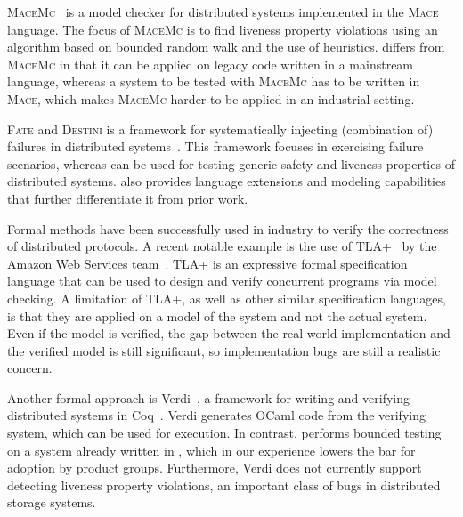 \textsc{MaceMc}~\cite{killian2007life} is a model checker for distributed systems implemented in the \textsc{Mace} language. The focus of \textsc{MaceMc} is to find liveness property violations using an algorithm based on bounded random walk and the use of heuristics. \psharp differs from \textsc{MaceMc} in that it can be applied on legacy code written in a mainstream language, whereas a system to be tested with \textsc{MaceMc} has to be written in \textsc{Mace}, which makes \textsc{MaceMc} harder to be applied in an industrial setting.

\textsc{Fate} and \textsc{Destini} is a framework for systematically injecting (combination of) failures in distributed systems~\cite{gunawi2011fate}. This framework focuses in exercising failure scenarios, whereas \psharp can be used for testing generic safety and liveness properties of distributed systems. \psharp also provides language extensions and modeling capabilities that further differentiate it from prior work.

Formal methods have been successfully used in industry to verify the correctness of distributed protocols. A recent notable example is the use of TLA+~\cite{lamport1994temporal} by the Amazon Web Services team~\cite{newcombe2015aws}. TLA+ is an expressive formal specification language that can be used to design and verify concurrent programs via model checking. A limitation of TLA+, as well as other similar specification languages, is that they are applied on a model of the system and not the actual system. Even if the model is verified, the gap between the real-world implementation and the verified model is still significant, so implementation bugs are still a realistic concern.

Another formal approach is Verdi~\cite{wilcox2015verdi}, a framework for writing and verifying distributed systems in Coq~\cite{barras1997coq}. Verdi generates OCaml code from the verifying system, which can be used for execution. In contrast, \psharp performs bounded testing on a system already written in \csharp, which in our experience lowers the bar for adoption by product groups. Furthermore, Verdi does not currently support detecting liveness property violations, an important class of bugs in distributed storage systems.
